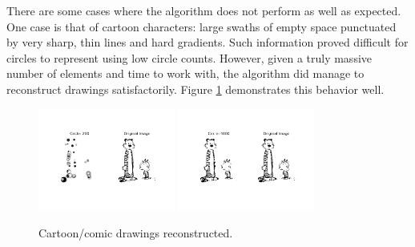 \documentclass[12pt]{article}
\begin{document}
There are some cases where the algorithm does not perform as well as expected. One case is that of cartoon characters: large swaths of empty space punctuated by very sharp, thin lines and hard gradients. Such information proved difficult for circles to represent using low circle counts. However, given a truly massive number of elements and time to work with, the algorithm did manage to reconstruct drawings satisfactorily. Figure \ref{fig:hobbes_0200} demonstrates this behavior well. 
\begin{figure}[H]
\centering
\noindent\includegraphics[width=0.4\textwidth]{../results/calvin_hobbes/calvin_hobbes_0200}
\noindent\includegraphics[width=0.4\textwidth]{../results/calvin_hobbes/calvin_hobbes_4000}
\caption{Cartoon/comic drawings reconstructed. }
\label{fig:hobbes_0200}
\end{figure}
\end{document}
